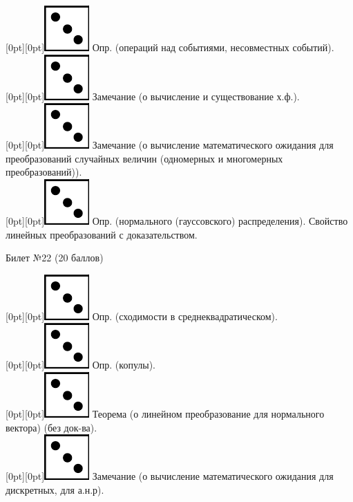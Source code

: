 \documentclass[10pt]{article}
\begin{document}
\raisebox{-1pt}[0pt][0pt]{\includegraphics[width=0.02\linewidth]{3.png}} Опр. (операций над событиями, несовместных событий). \\

\raisebox{-1pt}[0pt][0pt]{\includegraphics[width=0.02\linewidth]{3.png}} Замечание (о вычисление и существование х.ф.). \\

\raisebox{-1pt}[0pt][0pt]{\includegraphics[width=0.02\linewidth]{3.png}} Замечание (о вычисление  математического ожидания для преобразований случайных величин (одномерных и многомерных преобразований)). \\

\raisebox{-1pt}[0pt][0pt]{\includegraphics[width=0.02\linewidth]{3.png}}  Опр. (нормального (гауссовского) распределения). Свойство линейных преобразований с доказательством. \\

\begin{center} {\Large Билет №22 (20 баллов)} \end{center}

\raisebox{-1pt}[0pt][0pt]{\includegraphics[width=0.02\linewidth]{3.png}} Опр. (сходимости в среднеквадратическом). \\

\raisebox{-1pt}[0pt][0pt]{\includegraphics[width=0.02\linewidth]{3.png}} Опр. (копулы). \\

\raisebox{-1pt}[0pt][0pt]{\includegraphics[width=0.02\linewidth]{3.png}} Теорема (о линейном преобразование для нормального вектора) (без док-ва). \\

\raisebox{-1pt}[0pt][0pt]{\includegraphics[width=0.02\linewidth]{3.png}} Замечание (о вычисление  математического ожидания для дискретных, для а.н.р). \\
\end{document}
